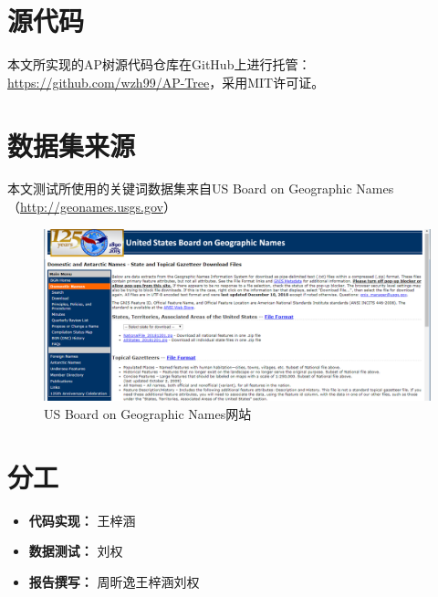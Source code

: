 \documentclass[UTF8]{ctexart}
\begin{document}
\newpage

\begin{appendices}

\section{源代码}
本文所实现的AP树源代码仓库在GitHub上进行托管：\url{https://github.com/wzh99/AP-Tree}，采用MIT许可证。

\section{数据集来源}
本文测试所使用的关键词数据集来自US Board on Geographic Names（\url{http://geonames.usgs.gov}）

\begin{figure}[htbp]
    \centering
    \includegraphics[width=\textwidth]{gn.png}
    \caption{US Board on Geographic Names网站}
\end{figure}

\section{分工}
\begin{itemize}
    \item \textbf{代码实现：} 王梓涵
    \item \textbf{数据测试：} 刘权
    \item \textbf{报告撰写：} 周昕逸\quad 王梓涵\quad 刘权
\end{itemize}

\end{appendices}
\end{document}
